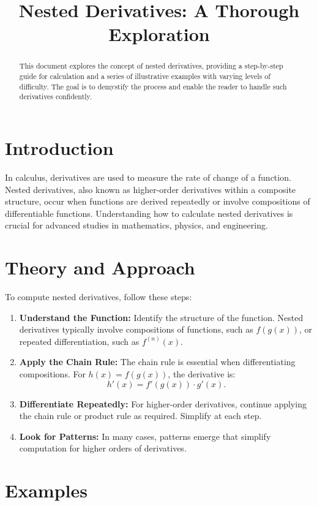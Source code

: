 \documentclass{article}
\title{Nested Derivatives: A Thorough Exploration}
\author{}
\date{}
\begin{document}
\maketitle

\begin{abstract}
This document explores the concept of nested derivatives, providing a step-by-step guide for calculation and a series of illustrative examples with varying levels of difficulty. The goal is to demystify the process and enable the reader to handle such derivatives confidently.
\end{abstract}

\section{Introduction}
In calculus, derivatives are used to measure the rate of change of a function. Nested derivatives, also known as higher-order derivatives within a composite structure, occur when functions are derived repeatedly or involve compositions of differentiable functions. Understanding how to calculate nested derivatives is crucial for advanced studies in mathematics, physics, and engineering.

\section{Theory and Approach}
To compute nested derivatives, follow these steps:
\begin{enumerate}
    \item \textbf{Understand the Function:} Identify the structure of the function. Nested derivatives typically involve compositions of functions, such as $f(g(x))$, or repeated differentiation, such as $f^{(n)}(x)$.
    \item \textbf{Apply the Chain Rule:} The chain rule is essential when differentiating compositions. For $h(x) = f(g(x))$, the derivative is:
    \[
    h'(x) = f'(g(x)) \cdot g'(x).
    \]
    \item \textbf{Differentiate Repeatedly:} For higher-order derivatives, continue applying the chain rule or product rule as required. Simplify at each step.
    \item \textbf{Look for Patterns:} In many cases, patterns emerge that simplify computation for higher orders of derivatives.
\end{enumerate}

\section{Examples}
\end{document}
